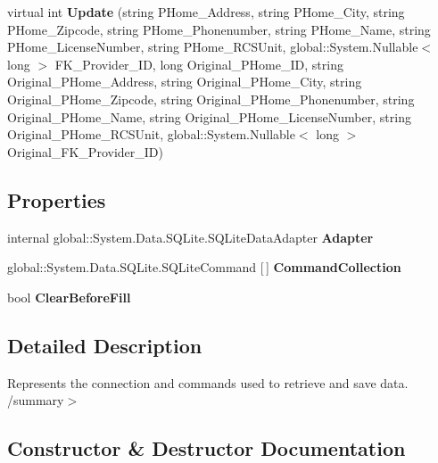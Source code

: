 \begin{DoxyCompactItemize}
\item 
virtual int \textbf{ Update} (string P\+Home\+\_\+\+Address, string P\+Home\+\_\+\+City, string P\+Home\+\_\+\+Zipcode, string P\+Home\+\_\+\+Phonenumber, string P\+Home\+\_\+\+Name, string P\+Home\+\_\+\+License\+Number, string P\+Home\+\_\+\+R\+C\+S\+Unit, global\+::\+System.\+Nullable$<$ long $>$ F\+K\+\_\+\+Provider\+\_\+\+ID, long Original\+\_\+\+P\+Home\+\_\+\+ID, string Original\+\_\+\+P\+Home\+\_\+\+Address, string Original\+\_\+\+P\+Home\+\_\+\+City, string Original\+\_\+\+P\+Home\+\_\+\+Zipcode, string Original\+\_\+\+P\+Home\+\_\+\+Phonenumber, string Original\+\_\+\+P\+Home\+\_\+\+Name, string Original\+\_\+\+P\+Home\+\_\+\+License\+Number, string Original\+\_\+\+P\+Home\+\_\+\+R\+C\+S\+Unit, global\+::\+System.\+Nullable$<$ long $>$ Original\+\_\+\+F\+K\+\_\+\+Provider\+\_\+\+ID)
\end{DoxyCompactItemize}
\subsection*{Properties}
\begin{DoxyCompactItemize}
\item 
internal global\+::\+System.\+Data.\+S\+Q\+Lite.\+S\+Q\+Lite\+Data\+Adapter \textbf{ Adapter}\hspace{0.3cm}{\ttfamily  [get]}
\item 
global\+::\+System.\+Data.\+S\+Q\+Lite.\+S\+Q\+Lite\+Command [$\,$] \textbf{ Command\+Collection}\hspace{0.3cm}{\ttfamily  [get]}
\item 
bool \textbf{ Clear\+Before\+Fill}\hspace{0.3cm}{\ttfamily  [get, set]}
\end{DoxyCompactItemize}


\subsection{Detailed Description}
Represents the connection and commands used to retrieve and save data. /summary$>$ 

\subsection{Constructor \& Destructor Documentation}
\mbox{\label{class_a_f_h___scheduler_1_1_home_inspection_data_set_table_adapters_1_1_provider___homes_table_adapter_a33dc4b1f7b51bfa2070b6d9ce44e5aac}} 
